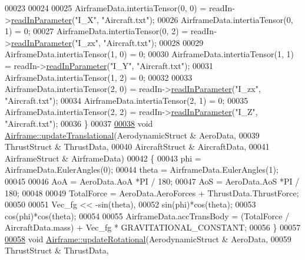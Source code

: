\begin{DoxyCode}
00023 
00024 
00025     AirframeData.intertiaTensor(0, 0) = readIn->\hyperlink{classread_in_data_a9ae979e74958b43424cb6cf4a22043d7}{readInParameter}(\textcolor{stringliteral}{"I\_X"}, \textcolor{stringliteral}{"Aircraft.txt"});
00026     AirframeData.intertiaTensor(0, 1) = 0;
00027     AirframeData.intertiaTensor(0, 2) = readIn->\hyperlink{classread_in_data_a9ae979e74958b43424cb6cf4a22043d7}{readInParameter}(\textcolor{stringliteral}{"I\_zx"}, \textcolor{stringliteral}{"Aircraft.txt"});
00028 
00029     AirframeData.intertiaTensor(1, 0) = 0;
00030     AirframeData.intertiaTensor(1, 1) = readIn->\hyperlink{classread_in_data_a9ae979e74958b43424cb6cf4a22043d7}{readInParameter}(\textcolor{stringliteral}{"I\_Y"}, \textcolor{stringliteral}{"Aircraft.txt"});
00031     AirframeData.intertiaTensor(1, 2) = 0;
00032 
00033     AirframeData.intertiaTensor(2, 0) = readIn->\hyperlink{classread_in_data_a9ae979e74958b43424cb6cf4a22043d7}{readInParameter}(\textcolor{stringliteral}{"I\_zx"}, \textcolor{stringliteral}{"Aircraft.txt"});
00034     AirframeData.intertiaTensor(2, 1) = 0;
00035     AirframeData.intertiaTensor(2, 2) = readIn->\hyperlink{classread_in_data_a9ae979e74958b43424cb6cf4a22043d7}{readInParameter}(\textcolor{stringliteral}{"I\_Z"}, \textcolor{stringliteral}{"Aircraft.txt"});
00036 \}
00037 
\hyperlink{group___airframe_ab3e18bd40fd5e68d793a164654a2821a}{00038} \textcolor{keywordtype}{void} \hyperlink{group___airframe_ab3e18bd40fd5e68d793a164654a2821a}{Airframe::updateTranslational}(AerodynamicStruct & AeroData, 
00039                                    ThrustStruct & ThrustData, 
00040                                     AircraftStruct & AircraftData, 
00041                                     AirframeStruct & AirframeData)
00042 \{
00043     phi     = AirframeData.EulerAngles(0);
00044     theta   = AirframeData.EulerAngles(1);
00045 
00046     AoA = AeroData.AoA *PI / 180;
00047     AoS = AeroData.AoS *PI / 180;
00048 
00049     TotalForce = AeroData.AeroForces + ThrustData.ThrustForce;
00050 
00051     Vec\_fg << -sin(theta),
00052             sin(phi)*cos(theta);
00053             cos(phi)*cos(theta);
00054 
00055     AirframeData.accTransBody = (TotalForce / AircraftData.mass) + Vec\_fg  * GRAVITATIONAL\_CONSTANT;
00056 \}
00057 
\hyperlink{group___airframe_af506bca34fa40f9ec0613b3be8f726eb}{00058} \textcolor{keywordtype}{void} \hyperlink{group___airframe_af506bca34fa40f9ec0613b3be8f726eb}{Airframe::updateRotational}(AerodynamicStruct & AeroData, 
00059                                 ThrustStruct & ThrustData, 

\end{DoxyCode}
